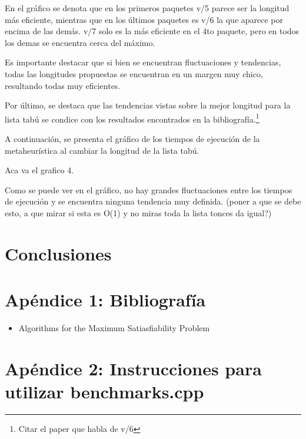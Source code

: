 \documentclass[a4paper,10pt]{article}
\begin{document}
En el gr\'afico se denota que en los primeros paquetes v/5 parece ser la longitud m\'as eficiente, mientras que en los \'ultimos paquetes es v/6 la que aparece por encima de las dem\'as. v/7 solo es la m\'as eficiente en el 4to paquete, pero en todos los demas se encuentra cerca del m\'aximo.

Es importante destacar que si bien se encuentran fluctuaciones y tendencias, todas las longitudes propuestas se encuentran en un margen muy chico, resultando todas muy eficientes.

Por \'ultimo, se destaca que las tendencias vistas sobre la mejor longitud para la lista tab\'u se condice con los resultados encontrados en la bibliograf\'ia.\footnote{Citar el paper que habla de v/6}

\bigskip

A continuaci\'on, se presenta el gr\'afico de los tiempos de ejecuci\'on de la metaheur\'istica al cambiar la longitud de la lista tab\'u.

Aca va el grafico 4.



Como se puede ver en el gr\'afico, no hay grandes fluctuaciones entre los tiempos de ejecuci\'on y se encuentra ninguna tendencia muy definida. (poner a que se debe esto, a que mirar si esta es O(1) y no miras toda la lista tonces da igual?)



\section*{Conclusiones}

\section*{Ap\'endice 1: Bibliograf\'ia}

\begin{itemize}
\item Algorithms for the Maximum Satiasfiability Problem 
\end{itemize}

\section*{Ap\'endice 2: Instrucciones para utilizar benchmarks.cpp}
\end{document}
